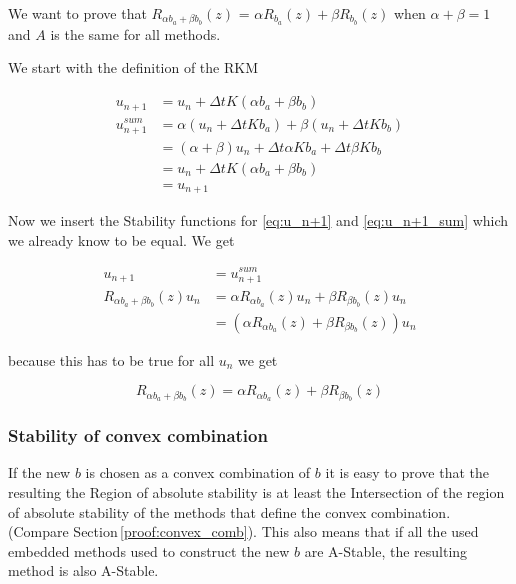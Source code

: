\documentclass{article}
\begin{document}
We want to prove that $R_{\alpha b_a+\beta b_b}(z)$ = $\alpha R_{ b_a}(z)+\beta R_{b_b}(z)$ when $\alpha + \beta = 1$ and $A$ is the same for all methods.

We start with the definition of the RKM

\begin{align}
u_{n+1} &= u_n + \Delta t K (\alpha b_a+\beta b_b) \label{eq:u_n+1}  \\
u_{n+1}^{sum} &= \alpha (u_n + \Delta t K b_a) + \beta (u_n + \Delta t K b_b) \label{eq:u_n+1_sum} \\
& = (\alpha + \beta) u_n + \Delta t \alpha K b_a + \Delta t \beta K b_b \\
&= u_n + \Delta t K (\alpha b_a+\beta b_b) \\
&=u_{n+1} 
\end{align}

Now we insert the Stability functions for \ref{eq:u_n+1} and \ref{eq:u_n+1_sum} which we already know to be equal. We get 

\begin{align}
u_{n+1} &= u_{n+1}^{sum} \\
R_{\alpha b_a+\beta b_b}(z) u_n &= \alpha R_{\alpha b_a}(z) u_n + \beta R_{\beta b_b}(z) u_n \\
&= (\alpha R_{\alpha b_a}(z) + \beta R_{\beta b_b}(z)) u_n
\end{align}

because this has to be true for all $u_n$ we get

\begin{equation}
R_{\alpha b_a+\beta b_b}(z) = \alpha R_{\alpha b_a}(z) + \beta R_{\beta b_b}(z) 
\end{equation}





\subsubsection{Stability of convex combination}
If the new $b$ is chosen as a convex combination of $b$ it is easy to prove that the resulting  the Region of absolute stability is at least the Intersection of the region of absolute stability of the methods that define the convex combination. (Compare Section\,\ref{proof:convex_comb}). This also means that if all the used embedded methods used to construct the new $b$ are A-Stable, the resulting method is also A-Stable.
\end{document}

